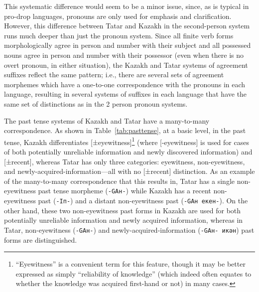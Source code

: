 \documentclass[a4paper,11pt]{article}
\begin{document}
This systematic difference would seem to be a minor issue, since, as is typical in pro-drop languages, pronouns 
are only used for emphasis and clarification.  However, this difference between Tatar and Kazakh in 
the second-person system runs much deeper than just the pronoun system.  Since all finite verb forms 
morphologically agree in person and number with their subject and all possessed nouns agree in person and 
number with their possessor (even when there is no overt pronoun, in either situation), the Kazakh and Tatar 
systems of agreement suffixes reflect the same pattern; i.e., there are several sets of agreement morphemes 
which have a one-to-one correspondence with the pronouns in each language, resulting in several systems of 
suffixes in each language that have the same set of distinctions as in the 2 person pronoun systems.

The past tense systems of Kazakh and Tatar have a many-to-many correspondence.  As shown 
in Table~\ref{tab:pasttense}, at a basic level, in the past tense, Kazakh 
differentiates [±eyewitness]\footnote{``Eyewitness'' is a convenient term for this feature, though it 
may be better expressed as simply ``reliability of knowledge'' (which indeed often equates to whether the 
knowledge was acquired first-hand or not) in many cases.} (where [-eyewitness] is used for cases of both 
potentially unreliable information and newly discovered information) and [±recent], whereas Tatar has only 
three categories: eyewitness, non-eyewitness, and newly-acquired-information---all with no [±recent] distinction.  As 
an example of the many-to-many correspondence that this results in, Tatar has a single non-eyewitness 
past tense morpheme (\texttt{-GAн-}) while Kazakh has a recent non-eyewitness past (\texttt{-Iп-}) and a 
distant non-eyewitness past (\texttt{-GAн екен-}).  On the other hand, these two non-eyewitness past 
forms in Kazakh are used for both potentially unreliable information and newly acquired information, whereas 
in Tatar, non-eyewitness (\texttt{-GAн-}) and newly-acquired-information (\texttt{-GAн- икән}) past forms are distinguished.
\end{document}
